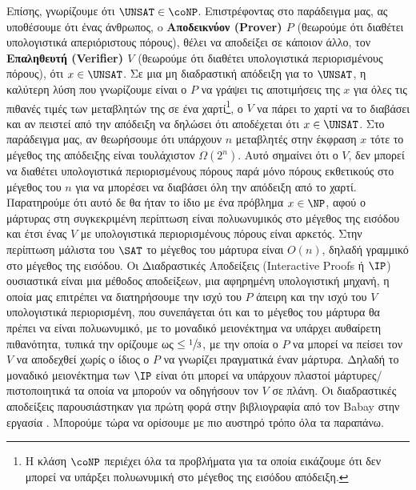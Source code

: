 Επίσης, γνωρίζουμε ότι $\UNSAT \in \coNP$. Επιστρέφοντας στο παράδειγμα μας, ας υποθέσουμε ότι ένας άνθρωπος, o \textbf{Αποδεικνύον (Prover) $P$} (θεωρούμε ότι διαθέτει υπολογιστικά απεριόριστους πόρους), θέλει να αποδείξει σε κάποιον άλλο, τον \textbf{Επαληθευτή (Verifier) $V$} (θεωρούμε ότι διαθέτει υπολογιστικά περιορισμένους πόρους), ότι $x \in \UNSAT$. Σε μια μη διαδραστική απόδειξη για το $\UNSAT$, η καλύτερη λύση που γνωρίζουμε είναι ο $P$ να γράψει τις αποτιμήσεις της $x$ για όλες τις πιθανές τιμές των μεταβλητών της σε ένα χαρτί\footnote{Η κλάση $\coNP$ περιέχει όλα τα προβλήματα για τα οποία εικάζουμε ότι δεν μπορεί να υπάρξει πολυωνυμική στο μέγεθος της εισόδου απόδειξη.}, ο $V$ να πάρει το χαρτί να το διαβάσει και αν πειστεί από την απόδειξη να δηλώσει ότι αποδέχεται ότι $x \in \UNSAT$. Στο παράδειγμα μας, αν θεωρήσουμε ότι υπάρχουν $n$ μεταβλητές στην έκφραση $x$ τότε το μέγεθος της απόδειξης είναι τουλάχιστον $Ω(2^n)$. Αυτό σημαίνει ότι ο $V$, δεν μπορεί να διαθέτει υπολογιστικά περιορισμένους πόρους παρά μόνο πόρους εκθετικούς στο μέγεθος του $n$ για να μπορέσει να διαβάσει όλη την απόδειξη από το χαρτί. Παρατηρούμε ότι αυτό δε θα ήταν το ίδιο με ένα πρόβλημα $x \in \NP$, αφού ο μάρτυρας στη συγκεκριμένη περίπτωση είναι πολυωνυμικός στο μέγεθος της εισόδου και έτσι ένας $V$ με υπολογιστικά περιορισμένους πόρους είναι αρκετός. Στην περίπτωση μάλιστα του $\SAT$ το μέγεθος του μάρτυρα είναι $O(n)$, δηλαδή γραμμικό στο μέγεθος της εισόδου. Οι Διαδραστικές Αποδείξεις (Interactive Proofs ή $\IP$) ουσιαστικά είναι μια μέθοδος αποδείξεων, μια αφηρημένη υπολογιστική μηχανή, η οποία μας επιτρέπει να διατηρήσουμε την ισχύ του $P$ άπειρη και την ισχύ του $V$ υπολογιστικά περιορισμένη, που συνεπάγεται ότι και το μέγεθος του μάρτυρα θα πρέπει να είναι πολυωνυμικό, με το μοναδικό μειονέκτημα να υπάρχει αυθαίρετη πιθανότητα, τυπικά την ορίζουμε ως $\le \sfrac{1}{3}$, με την οποία ο $P$ να μπορεί να πείσει τον $V$ να αποδεχθεί χωρίς ο ίδιος ο $P$ να γνωρίζει πραγματικά έναν μάρτυρα. Δηλαδή το μοναδικό μειονέκτημα των $\IP$ είναι ότι μπορεί να υπάρχουν πλαστοί μάρτυρες/πιστοποιητικά τα οποία να μπορούν να οδηγήσουν τον $V$ σε πλάνη. Οι διαδραστικές αποδείξεις παρουσιάστηκαν για πρώτη φορά στην βιβλιογραφία από τον Babay στην εργασία \cite{10.1145/22145.22192} . Μπορούμε τώρα να ορίσουμε με πιο αυστηρό τρόπο όλα τα παραπάνω.

